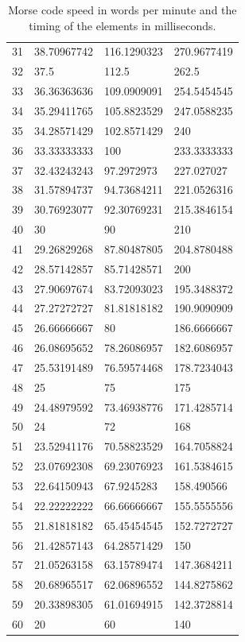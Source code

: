 \documentclass[a4paper]{tufte-handout}
\begin{document}
\begin{table}[!h]
\begin{tabular}{llll}
            31 & 38.70967742 & 116.1290323 & 270.9677419 \\
            32 & 37.5 & 112.5 & 262.5 \\
            33 & 36.36363636 & 109.0909091 & 254.5454545 \\
            34 & 35.29411765 & 105.8823529 & 247.0588235 \\
            35 & 34.28571429 & 102.8571429 & 240 \\
            36 & 33.33333333 & 100 & 233.3333333 \\
            37 & 32.43243243 & 97.2972973 & 227.027027 \\
            38 & 31.57894737 & 94.73684211 & 221.0526316 \\
            39 & 30.76923077 & 92.30769231 & 215.3846154 \\
            40 & 30 & 90 & 210 \\
            41 & 29.26829268 & 87.80487805 & 204.8780488 \\
            42 & 28.57142857 & 85.71428571 & 200 \\
            43 & 27.90697674 & 83.72093023 & 195.3488372 \\
            44 & 27.27272727 & 81.81818182 & 190.9090909 \\
            45 & 26.66666667 & 80 & 186.6666667 \\
            46 & 26.08695652 & 78.26086957 & 182.6086957 \\
            47 & 25.53191489 & 76.59574468 & 178.7234043 \\
            48 & 25 & 75 & 175 \\
            49 & 24.48979592 & 73.46938776 & 171.4285714 \\
            50 & 24 & 72 & 168 \\
            51 & 23.52941176 & 70.58823529 & 164.7058824 \\
            52 & 23.07692308 & 69.23076923 & 161.5384615 \\
            53 & 22.64150943 & 67.9245283 & 158.490566 \\
            54 & 22.22222222 & 66.66666667 & 155.5555556 \\
            55 & 21.81818182 & 65.45454545 & 152.7272727 \\
            56 & 21.42857143 & 64.28571429 & 150 \\
            57 & 21.05263158 & 63.15789474 & 147.3684211 \\
            58 & 20.68965517 & 62.06896552 & 144.8275862 \\
            59 & 20.33898305 & 61.01694915 & 142.3728814 \\
            60 & 20 & 60 & 140 \\
            \bottomrule
        \end{tabular}
        \caption{Morse code speed in words per minute and the timing of the elements in milliseconds.}
        \label{tab:morsetab}
    \end{table}
\end{document}
